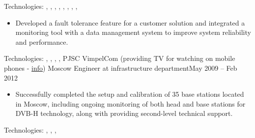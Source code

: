 Technologies: , , , , , , , , 
\horizontalline
% 
\begin{itemize}
    \item Developed a fault tolerance feature for a customer solution and integrated a monitoring tool with a data management system to improve system reliability and performance.
\end{itemize}
Technologies: , , , , 
\horizontalline
% 
\ressubheading
{PJSC VimpelCom}
{(providing TV for watching on mobile phones - \href{https://www.dvb.org/news/russia-to-launch-dvb-h-services}{info})}
{Moscow}
{Engineer at infrastructure department}{May 2009 -- Feb 2012}
\begin{itemize}
    \item Successfully completed the setup and calibration of 35 base stations located in Moscow, including ongoing monitoring of both head and base stations for DVB-H technology, along with providing second-level technical support.
\end{itemize}
Technologies: , , , 

